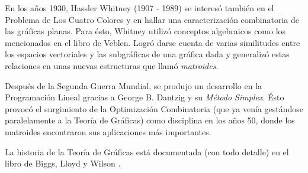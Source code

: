 En los años 1930, Hassler Whitney (1907 - 1989) se interesó también en el Problema de Los Cuatro Colores y en hallar una caracterización combinatoria de las gráficas planas. Para ésto, Whitney utilizó conceptos algebraicos como los mencionados en el libro de Veblen. Logró darse cuenta de varias similitudes entre los espacios vectoriales y las subgráficas de una gráfica dada y generalizó estas relaciones en unas nuevas estructuras que llamó \textit{matroides}.

Después de la Segunda Guerra Mundial, se produjo un desarrollo en la Programación Lineal gracias a George B. Dantzig y su \textit{Método Simplex}. Ésto provocó el surgimiento de la Optimización Combinatoria (que ya venía gestándose paralelamente a la Teoría de Gráficas) como disciplina en los años 50, donde los matroides encontraron sus aplicaciones más importantes.

La historia de la Teoría de Gráficas está documentada (con todo detalle) en el libro de Biggs, Lloyd y Wilson \cite{Biggs}.  



